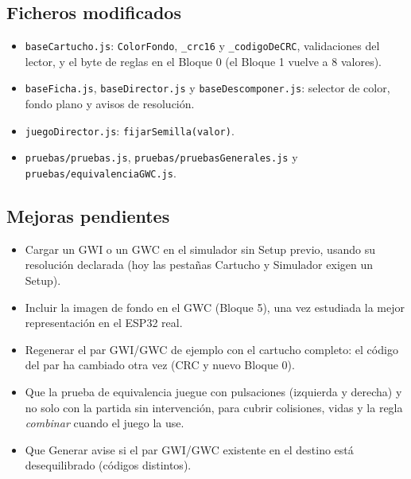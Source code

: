 \subsection{Ficheros modificados}
\label{sec:F5I14Ficheros}

\begin{itemize}
	\item \texttt{baseCartucho.js}: \texttt{ColorFondo}, \texttt{\_crc16} y \texttt{\_codigoDeCRC}, validaciones del lector, y el byte de reglas en el Bloque 0 (el Bloque 1 vuelve a 8 valores).
	\item \texttt{baseFicha.js}, \texttt{baseDirector.js} y \texttt{baseDescomponer.js}: selector de color, fondo plano y avisos de resolución.
	\item \texttt{juegoDirector.js}: \texttt{fijarSemilla(valor)}.
	\item \texttt{pruebas/pruebas.js}, \texttt{pruebas/pruebasGenerales.js} y \texttt{pruebas/equivalenciaGWC.js}.
\end{itemize}

\subsection{Mejoras pendientes}
\label{sec:F5I14Pendientes}

\begin{itemize}
	\item Cargar un GWI o un GWC en el simulador sin Setup previo, usando su resolución declarada (hoy las pestañas Cartucho y Simulador exigen un Setup).

	\item Incluir la imagen de fondo en el GWC (Bloque 5), una vez estudiada la mejor representación en el ESP32 real.

	\item Regenerar el par GWI/GWC de ejemplo con el cartucho completo: el código del par ha cambiado otra vez (CRC y nuevo Bloque 0).

	\item Que la prueba de equivalencia juegue con pulsaciones (izquierda y derecha) y no solo con la partida sin intervención, para cubrir colisiones, vidas y la regla \emph{combinar} cuando el juego la use.

	\item Que Generar avise si el par GWI/GWC existente en el destino está desequilibrado (códigos distintos).
\end{itemize}
